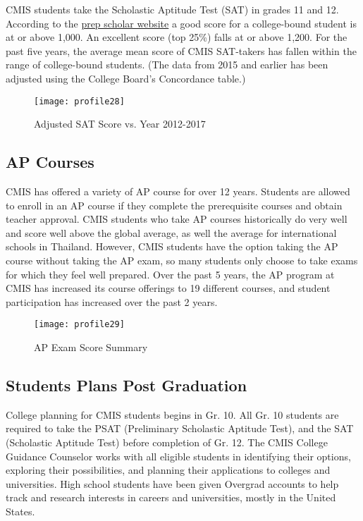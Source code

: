 CMIS students take the Scholastic Aptitude Test (SAT) in grades 11 and 12.  According to the \href{https://www.prepscholar.com/sat/s/}{prep scholar website} a good score for a college-bound student is at or above 1,000.  An excellent score (top 25\%) falls at or above 1,200.  For the past five years, the average mean score of CMIS SAT-takers has fallen within the range of college-bound students.  (The data from 2015 and earlier has been adjusted using the College Board’s Concordance table.)

\begin{figure}
\centering
\texttt{[image: profile28]}
\caption{Adjusted SAT Score vs. Year 2012-2017}
\end{figure}

\subsection{AP Courses}

CMIS has offered a variety of AP course for over 12 years. Students are allowed to enroll in an AP course if they complete the prerequisite courses and obtain teacher approval.  CMIS students who take AP courses historically do very well and score well above the global average, as well the average for international schools in Thailand.  However, CMIS students have the option taking the AP course without taking the AP exam, so many students only choose to take exams for which they feel well prepared.  Over the past 5 years, the AP program at CMIS has increased its course offerings to 19 different courses, and student participation has increased over the past 2 years.

\begin{figure}
\centering
\texttt{[image: profile29]}
\caption{AP Exam Score Summary}
\end{figure}

\subsection{Students Plans Post Graduation}

College planning for CMIS students begins in Gr. 10.  All Gr. 10 students are required to take the PSAT (Preliminary Scholastic Aptitude Test), and the SAT (Scholastic Aptitude Test) before completion of Gr. 12.  The CMIS College Guidance Counselor works with all eligible students in identifying their options, exploring their possibilities, and planning their applications to colleges and universities.  High school students have been given Overgrad accounts to help track and research interests in careers and universities, mostly in the United States.  

